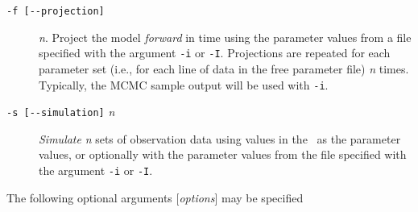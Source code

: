 \begin{description}
\item [\texttt{-f [-{}-projection]}] \emph{n}. Project the model \emph{forward} in time using the parameter values from a file specified with the argument \texttt{-i} or \texttt{-I}. Projections are repeated for each parameter set (i.e., for each line of data in the free parameter file) \emph{n} times. Typically, the MCMC sample output will be used with \texttt{-i}.
\item [\texttt{-s [-{}-simulation]} \emph{n}] \emph{Simulate} \emph{n} sets of observation data using values in the \config\ as the parameter values, or optionally with the parameter values from the file specified with the argument \texttt{-i} or \texttt{-I}.

\end{description}

The following optional arguments [\emph{options}] may be specified

